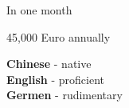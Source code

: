 \documentclass[9pt]{developercv} %
\begin{document}
\vspace{0.5cm}



\begin{minipage}[t]{0.4\textwidth} %
	\vspace{-\baselineskip} %
	
	In one month \\
	
	
	
	45,000 Euro annually
	
	
	\textbf{Chinese} - native\\
	\textbf{English} - proficient\\
	\textbf{Germen} - rudimentary
\end{minipage}
\hfill %
\begin{minipage}[t]{0.55\textwidth} %
	\vspace{-\baselineskip} %
	\begin{barchart}{5.5}
	\end{barchart}
\end{minipage}

\end{document}
